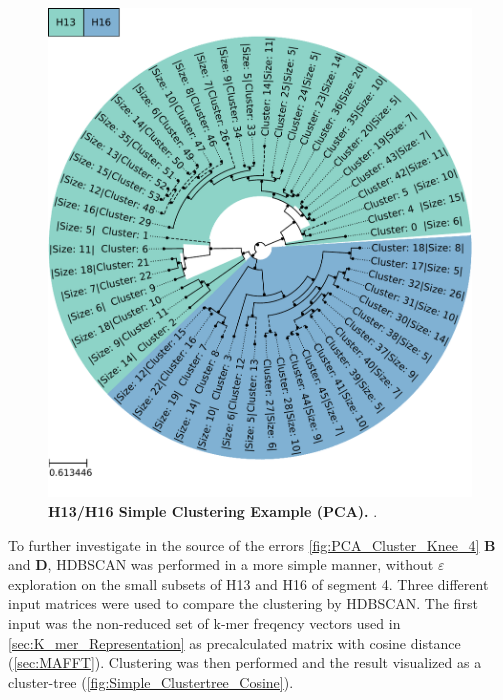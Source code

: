 \begin{figure}[hbt]
    \centering
    \includegraphics[width=\textwidth]{PCA/Clustertree_Segment_4_H_Simple.pdf}
    \caption[H13/H16 Simple Clustering Example (\Acrshort{PCA})]{\textbf{H13/H16 Simple Clustering Example (\Acrshort{PCA}).} .}
    \label{fig:Simple_Clustertree_PCA}
\end{figure}

To further investigate in the source of the errors \autoref{fig:PCA_Cluster_Knee_4} \textbf{\textsf{B}} and \textbf{\textsf{D}}, \gls{HDBSCAN} was performed in a more simple manner, without $\varepsilon$ exploration on the small subsets of H13 and H16 of segment 4. Three different input matrices were used to compare the clustering by \gls{HDBSCAN}. The first input was the non-reduced set of k-mer freqency vectors used in \autoref{sec:K_mer_Representation} as precalculated matrix with cosine distance (\autoref{sec:MAFFT}). Clustering was then performed and the result visualized as a cluster-tree (\autoref{fig:Simple_Clustertree_Cosine}). 

